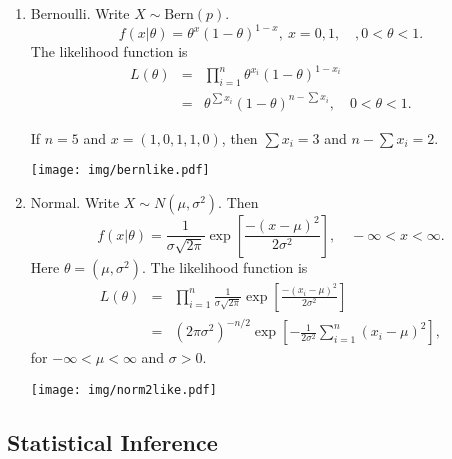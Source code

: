 \documentclass[11pt,english]{scrbook}
\begin{document}
\begin{enumerate}
\item Bernoulli.
\label{sec:org5648728}
Write \(X \sim \mathrm{Bern}(p)\).
\[
f(x|\theta) = \theta^{x}(1-\theta)^{1-x},\ x=0,1,\quad, 0 < \theta < 1.
\]
The likelihood function is
\begin{eqnarray*}
L(\theta) & = & \prod_{i=1}^{n}\theta^{x_{i}}(1-\theta)^{1-x_{i}}\\
 & = & \theta^{\sum x_{i}}(1-\theta)^{n-\sum x_{i}},\quad0<\theta<1.
\end{eqnarray*}

If \(n = 5\) and \(x = (1,0,1,1,0)\), then \(\sum x_{i}=3\) and \(n - \sum x_{i}=2\).

\begin{center}
\begin{center}
\texttt{[image: img/bernlike.pdf]}
\end{center}

\end{center}

\item Normal.
\label{sec:org92177c1}
Write \(X\sim N(\mu,\sigma^2)\). Then 
\[
f(x|\theta) = \frac{1}{\sigma\sqrt{2\pi}}\exp\left[\frac{-(x-\mu)^{2}}{2\sigma^{2}}\right],\quad-\infty<x<\infty.
\]
Here \(\theta = (\mu,\sigma^2)\).  The likelihood function is
\begin{eqnarray*}
L(\theta) & = & \prod_{i=1}^{n}\frac{1}{\sigma\sqrt{2\pi}}\exp\left[\frac{-(x_{i}-\mu)^{2}}{2\sigma^{2}}\right]\\
 & = & (2\pi\sigma^{2})^{-n/2}\exp\left[-\frac{1}{2\sigma^{2}}\sum_{i=1}^{n}(x_{i}-\mu)^{2}\right],
\end{eqnarray*}
for \(-\infty < \mu < \infty\) and \(\sigma > 0\).

\begin{center}
\begin{center}
\texttt{[image: img/norm2like.pdf]}
\end{center}

\end{center}
\end{enumerate}

\subsection{Statistical Inference}
\label{sec:org6e77940}
\end{document}
